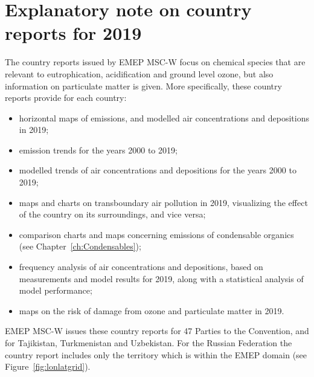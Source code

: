 \setcounter{page}{1}

\cleardoublepage
\chapter[2019 Country Reports]{Explanatory note on country reports for 2019}
\label{ch:appx_countryrep_2019}



The country reports issued by EMEP MSC-W \citep{Klein:2021} focus on chemical species that are relevant to eutrophication, acidification and ground level ozone, but also information on particulate matter is given. More specifically, these country reports provide for each country:
\begin{itemize}
\item horizontal maps of emissions, and modelled air concentrations and depositions in 2019;
\item emission trends for the years 2000 to 2019;
\item modelled trends of air concentrations and depositions for the years 2000 to 2019;
\item maps and charts on transboundary air pollution in 2019, visualizing the effect of the country on its surroundings, and vice versa;
\item comparison charts and maps concerning emissions of condensable organics (see Chapter~\ref{ch:Condensables});
\item frequency analysis of air concentrations and depositions, based on measurements and model results for 2019, along with a statistical analysis of model performance;
\item maps on the risk of damage from ozone and particulate matter in 2019.
\end{itemize}

EMEP MSC-W issues these country reports for 47 Parties to the Convention, and for Tajikistan, Turkmenistan and Uzbekistan. For the Russian Federation the country report includes only the territory which is within the EMEP domain (see Figure~\ref{fig:lonlatgrid}).

